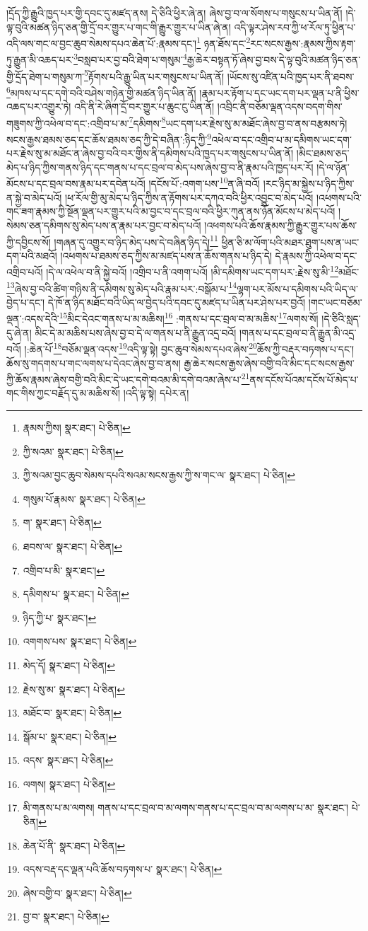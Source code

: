 །དྲོད་ཀྱི་རྒྱུའི་ཁྱད་པར་གྱི་དབང་དུ་མཛད་ནས། དེ་ཅིའི་ཕྱིར་ཞེ་ན། ཞེས་བྱ་བ་ལ་སོགས་པ་གསུངས་པ་ཡིན་ནོ། །དེ་ལྟ་བུའི་མཚན་ཉིད་ཅན་གྱི་དྲོ་བར་གྱུར་པ་གང་གི་རྒྱུར་གྱུར་པ་ཡིན་ཞེ་ན། འདི་ལྟར་ཤེས་རབ་ཀྱི་ཕ་རོལ་ཏུ་ཕྱིན་པ་འདི་ལས་གང་ལ་བྱང་ཆུབ་སེམས་དཔའ་ཆེན་པོ་:རྣམས་དང་།\footnote{རྣམས་ཀྱིས།  སྣར་ཐང་།  པེ་ཅིན། } ཉན་ཐོས་དང་\footnote{ཀྱི་སའམ་  སྣར་ཐང་།  པེ་ཅིན། }རང་སངས་རྒྱས་:རྣམས་ཀྱིས་རྟག་ཏུ་རྒྱུན་མི་འཆད་པར་\footnote{ཀྱི་སའམ་བྱང་ཆུབ་སེམས་དཔའི་སའམ་སངས་རྒྱས་ཀྱི་ས་གང་ལ་  སྣར་ཐང་།  པེ་ཅིན། }བསླབ་པར་བྱ་བའི་ཐེག་པ་གསུམ་\footnote{གསུམ་པོ་རྣམས་  སྣར་ཐང་།  པེ་ཅིན། }རྒྱ་ཆེར་བསྟན་ཏོ་ཞེས་བྱ་བས་དེ་ལྟ་བུའི་མཚན་ཉིད་ཅན་གྱི་དྲོད་ཐེག་པ་གསུམ་ཀ་\footnote{ག་  སྣར་ཐང་།  པེ་ཅིན། }རྟོགས་པའི་རྒྱུ་ཡིན་པར་གསུངས་པ་ཡིན་ནོ། །ཡོངས་སུ་འཛིན་པའི་ཁྱད་པར་ནི་ཐབས་\footnote{ཐབས་ལ་  སྣར་ཐང་།  པེ་ཅིན། }མཁས་པ་དང་དགེ་བའི་བཤེས་གཉེན་གྱི་མཚན་ཉིད་ཡིན་ནོ། །རྣམ་པར་རྟོག་པ་དང་ཡང་དག་པར་ལྡན་པ་ནི་ཕྱིས་འཆད་པར་འགྱུར་ཏེ། འདི་ནི་རེ་ཞིག་དྲོ་བར་གྱུར་པ་ཆུང་ངུ་ཡིན་ནོ། །འབྲིང་ནི་བཅོམ་ལྡན་འདས་བདག་གིས་གཟུགས་ཀྱི་འཕེལ་བ་དང་:འགྲིབ་པ་མ་\footnote{འགྲིབ་པ་མི་  སྣར་ཐང་། }དམིགས་\footnote{དམིགས་པ་  སྣར་ཐང་།  པེ་ཅིན། }ཡང་དག་པར་རྗེས་སུ་མ་མཐོང་ཞེས་བྱ་བ་ནས་བརྩམས་ཏེ། སངས་རྒྱས་ཐམས་ཅད་དང་ཆོས་ཐམས་ཅད་ཀྱི་དེ་བཞིན་:ཉིད་ཀྱི་\footnote{ཉིད་ཀྱི་པ་  སྣར་ཐང་། }འཕེལ་བ་དང་འགྲིབ་པ་མ་དམིགས་ཡང་དག་པར་རྗེས་སུ་མ་མཐོང་ན་ཞེས་བྱ་བའི་བར་གྱིས་ནི་དམིགས་པའི་ཁྱད་པར་གསུངས་པ་ཡིན་ནོ། །མིང་ཐམས་ཅད་མེད་པ་ཉིད་ཀྱིས་གནས་ཉིད་དང་གནས་པ་དང་བྲལ་བ་མེད་པས་ཞེས་བྱ་བ་ནི་རྣམ་པའི་ཁྱད་པར་རོ། །དེ་ལ་ཉོན་མོངས་པ་དང་བྲལ་བས་རྣམ་པར་དབེན་པའོ། །དངོས་པོ་:འགག་པས་\footnote{འགགས་པས་  སྣར་ཐང་།  པེ་ཅིན། }ན་ཞི་བའོ། །རང་ཉིད་མ་སྐྱེས་པ་ཉིད་ཀྱིས་ན་སྐྱེ་བ་མེད་པའོ། །ཕ་རོལ་གྱི་མུ་མེད་པ་ཉིད་ཀྱིས་ན་རྟོགས་པར་དཀའ་བའི་ཕྱིར་འབྱུང་བ་མེད་པའོ། །འཕགས་པའི་གང་ཟག་རྣམས་ཀྱི་སྔོན་ལྡན་པར་གྱུར་པའི་མ་བྱང་བ་དང་བྲལ་བའི་ཕྱིར་ཀུན་ནས་ཉོན་མོངས་པ་མེད་པའོ། །སེམས་ཅན་དམིགས་སུ་མེད་པས་ན་རྣམ་པར་བྱང་བ་མེད་པའོ། །འཕགས་པའི་ཆོས་རྣམས་ཀྱི་རྒྱུར་གྱུར་པས་ཆོས་ཀྱི་དབྱིངས་སོ། །གཞན་དུ་འགྱུར་བ་ཉིད་མེད་པས་དེ་བཞིན་ཉིད་དེ།\footnote{མེད་དོ།  སྣར་ཐང་།  པེ་ཅིན། } ཕྱིན་ཅི་མ་ལོག་པའི་མཐར་ཐུག་པས་ན་ཡང་དག་པའི་མཐའོ། །འཕགས་པ་ཐམས་ཅད་ཀྱིས་མ་མཛད་པས་ན་ཆོས་གནས་པ་ཉིད་དེ། དེ་རྣམས་ཀྱི་འཕེལ་བ་དང་འགྲིབ་པའོ། །དེ་ལ་འཕེལ་བ་ནི་སྐྱེ་བའོ། །འགྲིབ་པ་ནི་འགག་པའོ། །མི་དམིགས་ཡང་དག་པར་:རྗེས་སུ་མི་\footnote{རྗེས་སུ་མ་  སྣར་ཐང་།  པེ་ཅིན། }མཐོང་\footnote{མཐོང་བ་  སྣར་ཐང་།  པེ་ཅིན། }ཞེས་བྱ་བའི་ཚིག་གཉིས་ནི་དམིགས་སུ་མེད་པའི་རྣམ་པར་:བསྒོམ་པ་\footnote{སྒོམ་པ་  སྣར་ཐང་།  པེ་ཅིན། }ལྷག་པར་མོས་པ་དམིགས་པའི་ཡིད་ལ་བྱེད་པ་དང་། དེ་ཁོ་ན་ཉིད་མཐོང་བའི་ཡིད་ལ་བྱེད་པའི་དབང་དུ་མཛད་པ་ཡིན་པར་ཤེས་པར་བྱའོ། །གང་ཡང་བཅོམ་ལྡན་:འདས་དེའི་\footnote{འདས་  སྣར་ཐང་།  པེ་ཅིན། }མིང་དེའང་གནས་པ་མ་མཆིས།\footnote{ལགས།  སྣར་ཐང་།  པེ་ཅིན། } :གནས་པ་དང་བྲལ་བ་མ་མཆིས་\footnote{མི་གནས་པ་མ་ལགས། གནས་པ་དང་བྲལ་བ་མ་ལགས་གནས་པ་དང་བྲལ་བ་མ་ལགས་པ་མ་  སྣར་ཐང་།  པེ་ཅིན། }ལགས་སོ། །དེ་ཅིའི་སླད་དུ་ཞེ་ན། མིང་དེ་མ་མཆིས་པས་ཞེས་བྱ་བ་དེ་ལ་གནས་པ་ནི་རྒྱུན་འདྲ་བའོ། །གནས་པ་དང་བྲལ་བ་ནི་རྒྱུན་མི་འདྲ་བའོ། །:ཆེན་པོ་\footnote{ཆེན་པོ་ནི་  སྣར་ཐང་།  པེ་ཅིན། }བཅོམ་ལྡན་འདས་\footnote{འདས་བརྡ་དང་ལྡན་པའི་ཆོས་བཏགས་པ་  སྣར་ཐང་།  པེ་ཅིན། }འདི་ལྟ་སྟེ། བྱང་ཆུབ་སེམས་དཔའ་ཞེས་\footnote{ཞེས་བགྱི་བ་  སྣར་ཐང་།  པེ་ཅིན། }ཆོས་ཀྱི་བརྡར་བཏགས་པ་དང་། ཆོས་སུ་གདགས་པ་གང་ལགས་པ་དེའང་ཞེས་བྱ་བ་ནས། རྒྱ་ཆེར་སངས་རྒྱས་ཞེས་བགྱི་བའི་མིང་དང་སངས་རྒྱས་ཀྱི་ཆོས་རྣམས་ཞེས་བགྱི་བའི་མིང་དེ་ཡང་དགེ་བའམ་མི་དགེ་བའམ་ཞེས་པ་\footnote{བྱ་བ་  སྣར་ཐང་།  པེ་ཅིན། }ནས་དངོས་པོའམ་དངོས་པོ་མེད་པ་གང་གིས་ཀྱང་བརྗོད་དུ་མ་མཆིས་སོ། །འདི་ལྟ་སྟེ། དཔེར་ན། 
